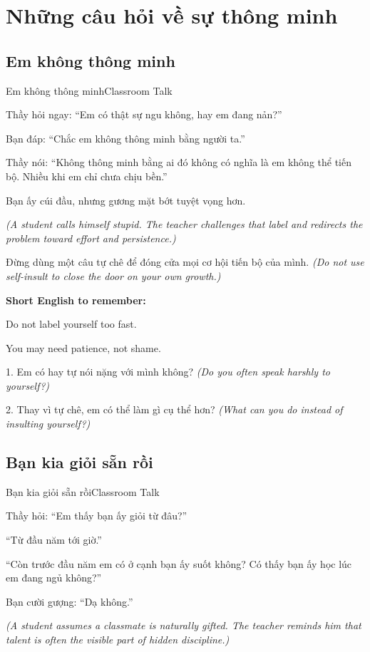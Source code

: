 \chapter{Những câu hỏi về sự thông minh}

\section{Em không thông minh}
\begin{truyen}{Em không thông minh}{Classroom Talk}

Thầy hỏi ngay: ``Em có thật sự ngu không, hay em đang nản?''

Bạn đáp: ``Chắc em không thông minh bằng người ta.''

Thầy nói: ``Không thông minh bằng ai đó không có nghĩa là em không thể tiến bộ. Nhiều khi em chỉ chưa chịu bền.''

Bạn ấy cúi đầu, nhưng gương mặt bớt tuyệt vọng hơn.

\textit{(A student calls himself stupid. The teacher challenges that label and redirects the problem toward effort and persistence.)}
\end{truyen}

\begin{baihoc}
Đừng dùng một câu tự chê để đóng cửa mọi cơ hội tiến bộ của mình.
\textit{(Do not use self-insult to close the door on your own growth.)}
\end{baihoc}

\begin{ghinhoanh}
\textbf{Short English to remember:}

Do not label yourself too fast.

You may need patience, not shame.
\end{ghinhoanh}

\begin{tuhocnhanh}
1. Em có hay tự nói nặng với mình không? \textit{(Do you often speak harshly to yourself?)}

2. Thay vì tự chê, em có thể làm gì cụ thể hơn? \textit{(What can you do instead of insulting yourself?)}
\end{tuhocnhanh}
\ngancach

\section{Bạn kia giỏi sẵn rồi}
\begin{truyen}{Bạn kia giỏi sẵn rồi}{Classroom Talk}

Thầy hỏi: ``Em thấy bạn ấy giỏi từ đâu?''

``Từ đầu năm tới giờ.''

``Còn trước đầu năm em có ở cạnh bạn ấy suốt không? Có thấy bạn ấy học lúc em đang ngủ không?''

Bạn cười gượng: ``Dạ không.''

\textit{(A student assumes a classmate is naturally gifted. The teacher reminds him that talent is often the visible part of hidden discipline.)}
\end{truyen}


